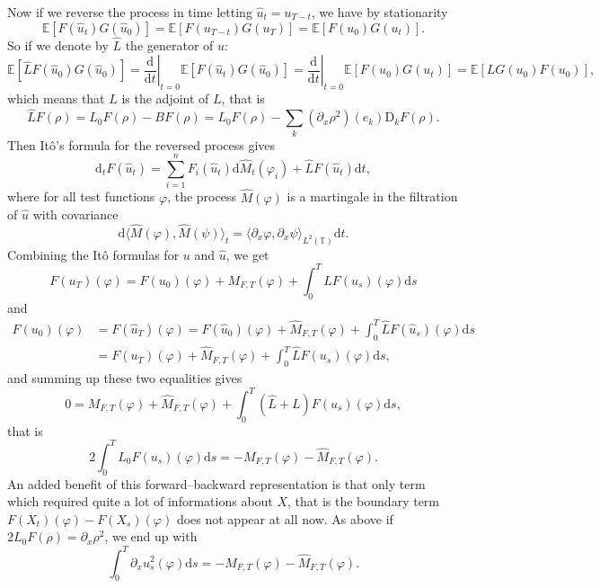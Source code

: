 \documentclass[a4paper,11pt]{article}
\newcommand{\mathD}{\mathrm{D}}
\newcommand{\mathd}{\mathrm{d}}
\begin{document}
Now if we reverse the process in time letting $\hat{u}_t = u_{T - t}$, we have
by stationarity
\[ \mathbb{E} [F (\hat{u}_t) G (\hat{u}_0)] =\mathbb{E} [F (u_{T - t}) G
   (u_T)] =\mathbb{E} [F (u_0) G (u_t)] . \]
So if we denote by $\hat{L}$ the generator of $\hat{u}$:
\[ \mathbb{E} [\hat{L} F (\hat{u}_0) G (\hat{u}_0)] = \left.
   \frac{\mathd}{\mathd t} \right|_{t = 0} \mathbb{E} [F (\hat{u}_t) G
   (\hat{u}_0)] = \left. \frac{\mathd}{\mathd t} \right|_{t = 0} \mathbb{E}
   [F (u_0) G (u_t)] =\mathbb{E} [L G (u_0) F (u_0)], \]
which means that $\hat{L}$ is the adjoint of $L$, that is
\[ \hat{L} F (\rho) = L_0 F (\rho) - B F (\rho) = L_0 F (\rho) - \sum_k
   (\partial_x \rho^2) (e_k) \mathD_k F (\rho) . \]
Then It{\^o}'s formula for the reversed process gives
\[ \mathd_t F (\hat{u}_t) = \sum_{i = 1}^n F_i (\hat{u}_t) \mathd \hat{M}_t
   (\varphi_i) + \hat{L} F (\hat{u}_t) \mathd t, \]
where for all test functions $\varphi$, the process $\hat{M} (\varphi)$ is a
martingale in the filtration of $\hat{u}$ with covariance
\[ \mathd \langle \hat{M} (\varphi), \hat{M} (\psi) \rangle_t = \langle
   \partial_x \varphi, \partial_x \psi \rangle_{L^2 (\mathbb{T})} \mathd t.
\]
Combining the It{\^o} formulas for $u$ and $\hat{u}$, we get
\[ F (u_T) (\varphi) = F (u_0) (\varphi) + M_{F, T} (\varphi) + \int_0^T L F
   (u_s) (\varphi) \mathd s \]
and
\begin{align*}
   F (u_0) (\varphi) & = F (\hat{u}_T) (\varphi) = F (\hat{u}_0) (\varphi) +  \hat{M}_{F, T} (\varphi) + \int_0^T \hat{L} F (\hat{u}_s) (\varphi) \mathd s \\
   & = F (u_T) (\varphi) + \hat{M}_{F, T} (\varphi) + \int_0^T \hat{L} F (u_s) (\varphi) \mathd s,
\end{align*}
and summing up these two equalities gives
\[ 0 = M_{F, T} (\varphi) + \hat{M}_{F, T} (\varphi) + \int_0^T (\hat{L} + L)
   F (u_s) (\varphi) \mathd s, \]
that is
\[ 2 \int_0^T L_0 F (u_s) (\varphi) \mathd s = - M_{F, T} (\varphi) -
   \hat{M}_{F, T} (\varphi) . \]
An added benefit of this forward--backward representation is that only term
which required quite a lot of informations about $X$, that is the boundary
term $F (X_t) (\varphi) - F (X_s) (\varphi)$ does not appear at all now. As
above if $2 L_0 F (\rho) = \partial_x \rho^2$, we end up with
\begin{equation}
  \label{eq:martingale trick sbe}  \int_0^T \partial_x u_s^2 (\varphi) \mathd
  s = - M_{F, T} (\varphi) - \hat{M}_{F, T} (\varphi) .
\end{equation}
\
\end{document}
